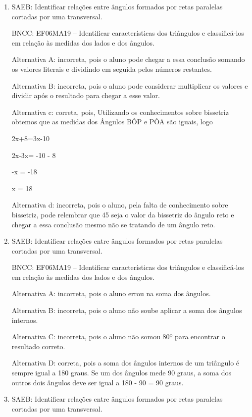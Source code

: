 	\begin{enumerate}

		\item SAEB: Identificar relações entre ângulos formados por retas paralelas
cortadas por uma transversal.

BNCC: EF06MA19 -- Identificar características dos triângulos e
classificá-los em relação às medidas dos lados e dos ângulos.

Alternativa A: incorreta, pois o aluno pode chegar a essa conclusão
somando os valores literais e dividindo em seguida pelos números
restantes.

Alternativa B: incorreta, pois o aluno pode considerar multiplicar os
valores e dividir após o resultado para chegar a esse valor.

Alternativa c: correta, pois, Utilizando os conhecimentos sobre
bissetriz obtemos que as medidas dos Ângulos BÔP e PÔA são iguais, logo

2x+8=3x-10

2x-3x= -10 - 8

-x = -18

x = 18

Alternativa d: incorreta, pois o aluno, pela falta de conhecimento sobre
bissetriz, pode relembrar que 45 seja o valor da bissetriz do ângulo
reto e chegar a essa conclusão mesmo não se tratando de um ângulo reto.

		\item SAEB: Identificar relações entre ângulos formados por retas paralelas
cortadas por uma transversal.

BNCC: EF06MA19 -- Identificar características dos triângulos e
classificá-los em relação às medidas dos lados e dos ângulos.

Alternativa A: incorreta, pois o aluno errou na soma dos ângulos.

Alternativa B: incorreta, pois o aluno não soube aplicar a soma dos
ângulos internos.

Alternativa C: incorreta, pois o aluno não somou 80º para encontrar o
resultado correto.

Alternativa D: correta, pois a soma dos ângulos internos de um triângulo
é sempre igual a 180 graus. Se um dos ângulos mede 90 graus, a soma dos
outros dois ângulos deve ser igual a 180 - 90 = 90 graus.

		\item SAEB: Identificar relações entre ângulos formados por retas paralelas
cortadas por uma transversal.


\end{enumerate}
